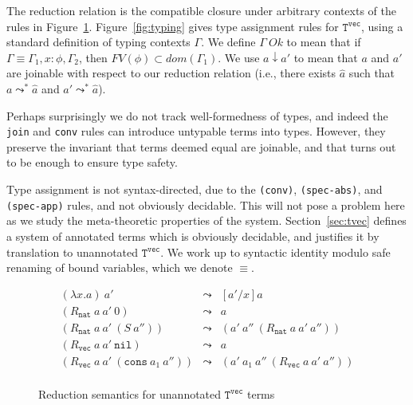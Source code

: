 \documentclass[copyright]{eptcs}
\newcommand{\vc}[0]{\texttt{vec}}
\newcommand{\nat}[0]{\texttt{nat}}
\newcommand{\Tvec}[0]{\texttt{T}^\vc}
\newcommand{\nil}[0]{\texttt{nil}}
\newcommand{\cons}[0]{\texttt{cons}}
\begin{document}
The reduction relation is the compatible closure under arbitrary
contexts of the rules in Figure~\ref{fig:red}.
Figure~\ref{fig:typing} gives type assignment rules for $\Tvec$, using
a standard definition of typing contexts $\Gamma$.  We define
$\Gamma\ \textit{Ok}$ to mean that if
$\Gamma\equiv\Gamma_1,x:\phi,\Gamma_2$, then
$\textit{FV}(\phi)\subset\textit{dom}(\Gamma_1)$. We use $a\downarrow
a'$ to mean that $a$ and $a'$ are joinable with respect to our
reduction relation (i.e., there exists $\hat{a}$ such that
$a\leadsto^*\hat{a}$ and $a'\leadsto^*\hat{a}$).

Perhaps surprisingly we do not track well-formedness of types, and
indeed the \texttt{join} and \texttt{conv} rules can introduce
untypable terms into types. However, they preserve the invariant
that terms deemed equal are joinable, and that turns out to
be enough to ensure type safety.

Type assignment is not syntax-directed, due to the \texttt{(conv)},
\texttt{(spec-abs)}, and \texttt{(spec-app)} rules, and not obviously
decidable.  This will not pose a problem here as we study the
meta-theoretic properties of the system.  Section~\ref{sec:tvec}
defines a system of annotated terms which is obviously decidable, and
justifies it by translation to unannotated $\Tvec$.  We work up to
syntactic identity modulo safe renaming of bound variables, which we
denote $\equiv$.

\begin{figure}
\[
\begin{array}{lll}
(\lambda x.a)\ a' & \leadsto & [a'/x]a \\
(R_\nat\ a\ a'\ 0) & \leadsto & a \\
(R_\nat\ a\ a'\ (S\ a'')) & \leadsto & (a'\ a''\ (R_\nat\ a\ a'\ a'')) \\
(R_\vc\ a\ a'\ \nil) & \leadsto & a \\
(R_\vc\ a\ a'\ (\cons\ a_1\ a'')) & \leadsto & (a'\ a_1\ a''\ (R_\vc\ a\ a'\ a'')) \\
\end{array}
\]
\caption{Reduction semantics for unannotated $\Tvec$ terms}
\label{fig:red}
\end{figure}
\end{document}
